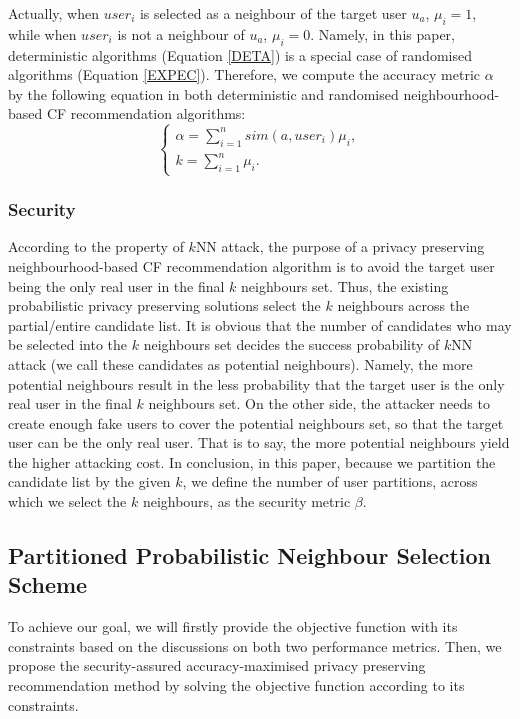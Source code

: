 \documentclass[11pt]{article}
\begin{document}
Actually, when $user_i$ is selected as a neighbour of the target user $u_a$, $\mu_{i}=1$, while when $user_i$ is not a neighbour of $u_a$, $\mu_{i}=0$. Namely, in this paper, deterministic algorithms (Equation \eqref{DETA}) is a special case of randomised algorithms (Equation \eqref{EXPEC}). Therefore, we compute the accuracy metric $\alpha$ by the following equation in both deterministic and randomised neighbourhood-based CF recommendation algorithms:
\begin{equation}
\label{ACCURACY}
\left\{ \begin{array}{l}
\alpha=\sum_{i=1}^{n}{sim(a,user_{i})\mu_{i}},\\
k=\sum_{i=1}^{n}{\mu_{i}}.
\end{array}\right.
\end{equation}

\subsubsection{Security}
According to the property of $k$NN attack, the purpose of a privacy preserving neighbourhood-based CF recommendation algorithm is to avoid the target user being the only real user in the final $k$ neighbours set. Thus, the existing probabilistic privacy preserving solutions select the $k$ neighbours across the partial/entire candidate list. It is obvious that the number of candidates who may be selected into the $k$ neighbours set decides the success probability of $k$NN attack (we call these candidates as potential neighbours). Namely, the more potential neighbours result in the less probability that the target user is the only real user in the final $k$ neighbours set. On the other side, the attacker needs to create enough fake users to cover the potential neighbours set, so that the target user can be the only real user. That is to say, the more potential neighbours yield the higher attacking cost. In conclusion, in this paper, because we partition the candidate list by the given $k$, we define the number of user partitions, across which we select the $k$ neighbours, as the security metric $\beta$.


\subsection{Partitioned Probabilistic Neighbour Selection Scheme}
To achieve our goal, we will firstly provide the objective function with its constraints based on the discussions on both two performance metrics. Then, we propose the security-assured accuracy-maximised privacy preserving recommendation method by solving the objective function according to its constraints.
\end{document}
